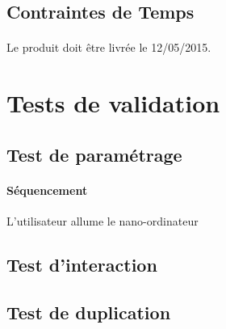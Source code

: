 \documentclass[a4paper, titlepage, oneside, 12pt]{article}%
\begin{document}
\subsection{Contraintes de Temps}
\paragraph{}
Le produit doit être livrée le 12/05/2015.

\section{Tests de validation}

\subsection{Test de paramétrage}
\paragraph{Séquencement}
L'utilisateur allume le nano-ordinateur

\subsection{Test d'interaction}

\subsection{Test de duplication}

 
\end{document}
